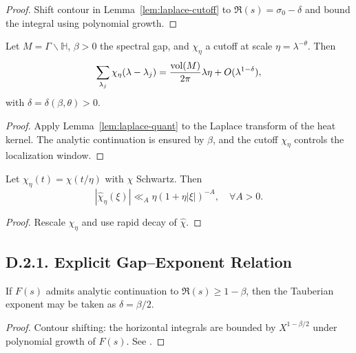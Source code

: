 \begin{proof}
Shift contour in Lemma~\ref{lem:laplace-cutoff} to $\Re(s)=\sigma_0-\delta$ and bound the integral using polynomial growth.  
\end{proof}

\medskip

\begin{proposition}\label{prop:localized-tauber}
Let $M=\Gamma\backslash \mathbb H$, $\beta>0$ the spectral gap, and $\chi_\eta$ a cutoff at scale $\eta=\lambda^{-\theta}$.  
Then
\[
\sum_{\lambda_j} \chi_\eta(\lambda-\lambda_j) = \frac{\operatorname{vol}(M)}{2\pi}\lambda \eta + O(\lambda^{1-\delta}),
\]
with $\delta=\delta(\beta,\theta)>0$.
\end{proposition}

\begin{proof}
Apply Lemma~\ref{lem:laplace-quant} to the Laplace transform of the heat kernel.  
The analytic continuation is ensured by $\beta$, and the cutoff $\chi_\eta$ controls the localization window.  
\end{proof}

\medskip

\begin{lemma}\label{lem:cutoff-bounds}
Let $\chi_\eta(t)=\chi(t/\eta)$ with $\chi$ Schwartz. Then
\[
|\widehat{\chi}_\eta(\xi)| \ll_A \eta (1+\eta|\xi|)^{-A}, \quad \forall A>0.
\]
\end{lemma}

\begin{proof}
Rescale $\chi_\eta$ and use rapid decay of $\widehat{\chi}$.  
\end{proof}

\medskip

\subsection*{D.2.1. Explicit Gap--Exponent Relation}

\begin{proposition}\label{prop:gap-exponent}
If $F(s)$ admits analytic continuation to $\Re(s)\ge 1-\beta$, then the Tauberian exponent may be taken as $\delta=\beta/2$.  
\end{proposition}

\begin{proof}
Contour shifting: the horizontal integrals are bounded by $X^{1-\beta/2}$ under polynomial growth of $F(s)$.  
See \cite{JakobsonNaud2007}.  
\end{proof}

